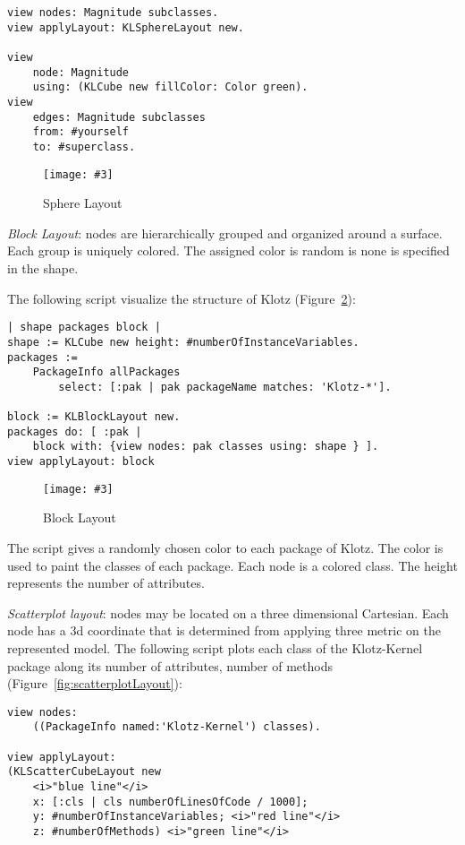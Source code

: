 \documentclass{sig-alternate}
\newcommand{\fig}[4]{
	\begin{figure}[#1]
		\centering
		\texttt{[image: \#3]}
		\caption{\label{fig:#3}#4}
	\end{figure}}
\newcommand{\figref}[1]{Figure~\ref{fig:#1}}
\begin{document}
\begin{lstlisting}
view nodes: Magnitude subclasses. 
view applyLayout: KLSphereLayout new. 

view 
	node: Magnitude 
	using: (KLCube new fillColor: Color green). 
view 
	edges: Magnitude subclasses 
	from: #yourself 
	to: #superclass.
\end{lstlisting}
\fig{}{0.4}{sphereLayout}{Sphere Layout}

\emph{Block Layout}: nodes are hierarchically grouped and organized around a surface. Each group is uniquely colored. The assigned color is random is none is specified in the shape.


The following script visualize the structure of Klotz (\figref{figure9.png}): 

\begin{lstlisting}
| shape packages block |
shape := KLCube new height: #numberOfInstanceVariables.
packages := 
	PackageInfo allPackages 
		select: [:pak | pak packageName matches: 'Klotz-*'].

block := KLBlockLayout new.
packages do: [ :pak | 
	block with: {view nodes: pak classes using: shape } ].
view applyLayout: block
	\end{lstlisting}
\fig{}{0.4}{figure9.png}{Block Layout}

The script gives a randomly chosen color to each package of Klotz. The color is used to paint the classes of each package. Each node is a colored class. The height represents the number of attributes. 

\emph{Scatterplot layout}: nodes may be located on a three dimensional Cartesian. Each node has a 3d coordinate that is determined from applying three metric on the represented model. The following script plots each class of the Klotz-Kernel package along its number of attributes, number of methods (\figref{scatterplotLayout}):

\begin{lstlisting}
view nodes: 
	((PackageInfo named:'Klotz-Kernel') classes).

view applyLayout: 
(KLScatterCubeLayout new
    <i>"blue line"</i>
    x: [:cls | cls numberOfLinesOfCode / 1000]; 
    y: #numberOfInstanceVariables; <i>"red line"</i>
    z: #numberOfMethods) <i>"green line"</i>
\end{lstlisting}
\end{document}
